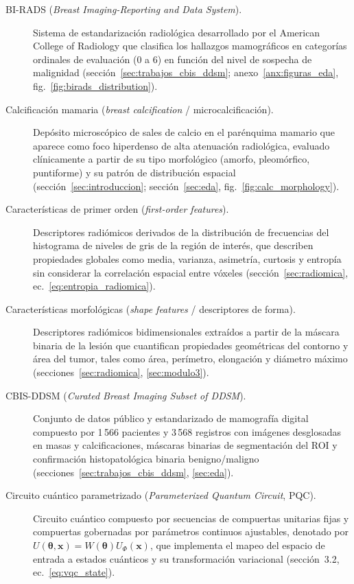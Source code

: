 \begin{description}
  \item[BI-RADS (\textit{Breast Imaging-Reporting and Data System}).] Sistema de estandarización radiológica desarrollado por el American College of Radiology que clasifica los hallazgos mamográficos en categorías ordinales de evaluación (0 a 6) en función del nivel de sospecha de malignidad (sección~\ref{sec:trabajos_cbis_ddsm}; anexo~\ref{anx:figuras_eda}, fig.~\ref{fig:birads_distribution}).

  \item[Calcificación mamaria (\textit{breast calcification} / microcalcificación).] Depósito microscópico de sales de calcio en el parénquima mamario que aparece como foco hiperdenso de alta atenuación radiológica, evaluado clínicamente a partir de su tipo morfológico (amorfo, pleomórfico, puntiforme) y su patrón de distribución espacial (sección~\ref{sec:introduccion}; sección~\ref{sec:eda}, fig.~\ref{fig:calc_morphology}).

  \item[Características de primer orden (\textit{first-order features}).] Descriptores radiómicos derivados de la distribución de frecuencias del histograma de niveles de gris de la región de interés, que describen propiedades globales como media, varianza, asimetría, curtosis y entropía sin considerar la correlación espacial entre vóxeles (sección~\ref{sec:radiomica}, ec.~\ref{eq:entropia_radiomica}).

  \item[Características morfológicas (\textit{shape features} / descriptores de forma).] Descriptores radiómicos bidimensionales extraídos a partir de la máscara binaria de la lesión que cuantifican propiedades geométricas del contorno y área del tumor, tales como área, perímetro, elongación y diámetro máximo (secciones~\ref{sec:radiomica}, \ref{sec:modulo3}).

  \item[CBIS-DDSM (\textit{Curated Breast Imaging Subset of DDSM}).] Conjunto de datos público y estandarizado de mamografía digital compuesto por 1\,566 pacientes y 3\,568 registros con imágenes desglosadas en masas y calcificaciones, máscaras binarias de segmentación del ROI y confirmación histopatológica binaria benigno/maligno (secciones~\ref{sec:trabajos_cbis_ddsm}, \ref{sec:eda}).

  \item[Circuito cuántico parametrizado (\textit{Parameterized Quantum Circuit}, PQC).] Circuito cuántico compuesto por secuencias de compuertas unitarias fijas y compuertas gobernadas por parámetros continuos ajustables, denotado por $U(\boldsymbol{\theta}, \mathbf{x}) = W(\boldsymbol{\theta})U_\Phi(\mathbf{x})$, que implementa el mapeo del espacio de entrada a estados cuánticos y su transformación variacional (sección~3.2, ec.~\ref{eq:vqc_state}).


\end{description}
